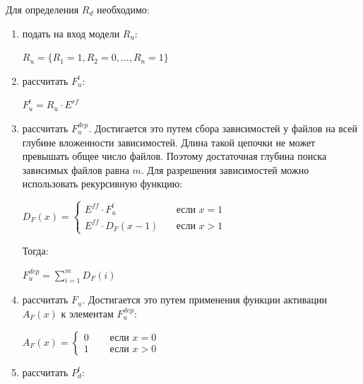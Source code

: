 \documentclass{article}
\begin{document}
  Для определения $R_{d}$ необходимо:
  \begin{enumerate}
    \item подать на вход модели $R_{u}$:

    \begin{center}
      $R_{u} = \{R_{1} = 1, R_{2} = 0, ..., R_{n} = 1\}$
    \end{center}

    \item рассчитать $F^{t}_{u}$:

    \begin{center}
      $F^{t}_{u} = R_{u} \cdot E^{rf}$
    \end{center}

    \item рассчитать $F^{dep}_{u}$. Достигается это путем сбора зависимостей у файлов на всей глубине вложенности зависимостей. Длина такой цепочки не может превышать общее число файлов. Поэтому достаточная глубина поиска зависимых файлов равна $m$. Для разрешения зависимостей можно использовать рекурсивную функцию:
    
    \begin{center}
    $
    D_{F}(x) = 
      \begin{cases}
        E^{ff} \cdot F^{t}_{u} & \quad \text{если } x = 1 \\
        E^{ff} \cdot D_{F}(x - 1) & \quad \text{если } x > 1
      \end{cases}
    $
    \end{center}

    Тогда:

    \begin{center}
      $F^{dep}_{u} = \displaystyle\sum^m_{i = 1}D_{F}(i)$
    \end{center}

    \item рассчитать $F_{u}$. Достигается это путем применения функции активации $A_{F}(x)$ к элементам $F^{dep}_{u}$:

    \begin{center}
      $
      A_{F}(x) = 
        \begin{cases}
          0 & \quad \text{ если } x = 0 \\
          1 & \quad \text{ если } x > 0
        \end{cases}
      $
    \end{center}

    \item рассчитать $P^{t}_{d}$:


\end{enumerate}
\end{document}
